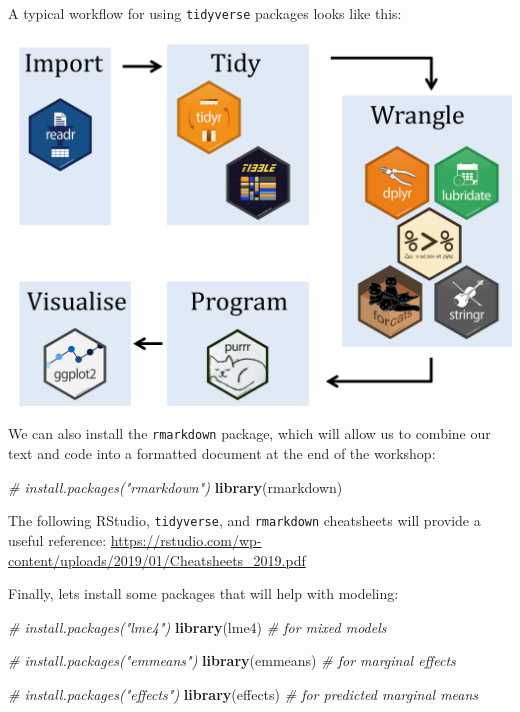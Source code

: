 \documentclass[]{book}
\newenvironment{Shaded}{\begin{snugshade}}{\end{snugshade}}
\newcommand{\CommentTok}[1]{\textcolor[rgb]{0.56,0.35,0.01}{\textit{#1}}}
\newcommand{\KeywordTok}[1]{\textcolor[rgb]{0.13,0.29,0.53}{\textbf{#1}}}
\newcommand{\NormalTok}[1]{#1}
\begin{document}
A typical workflow for using \texttt{tidyverse} packages looks like this:

\includegraphics{R/Rintro/images/tidy_workflow.png}

We can also install the \texttt{rmarkdown} package, which will allow us to
combine our text and code into a formatted document at the end of
the workshop:

\begin{Shaded}
\begin{Highlighting}[]
\CommentTok{# install.packages("rmarkdown")}
\KeywordTok{library}\NormalTok{(rmarkdown)}
\end{Highlighting}
\end{Shaded}

The following RStudio, \texttt{tidyverse}, and \texttt{rmarkdown} cheatsheets will provide a
useful reference: \url{https://rstudio.com/wp-content/uploads/2019/01/Cheatsheets_2019.pdf}

Finally, lets install some packages that will help with modeling:

\begin{Shaded}
\begin{Highlighting}[]
\CommentTok{# install.packages("lme4")}
\KeywordTok{library}\NormalTok{(lme4)  }\CommentTok{# for mixed models}

\CommentTok{# install.packages("emmeans")}
\KeywordTok{library}\NormalTok{(emmeans)  }\CommentTok{# for marginal effects}

\CommentTok{# install.packages("effects")}
\KeywordTok{library}\NormalTok{(effects)  }\CommentTok{# for predicted marginal means}
\end{Highlighting}
\end{Shaded}
\end{document}
